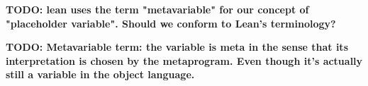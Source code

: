 \documentclass[table,dvipsnames,acmsmall]{acmart}
\theoremstyle{definition}
\begin{document}
\newcommand{\examp}[1]{{\nopad \footnotesize 
\[
\begin{array}[t]{@{}l}
#1
\end{array}
\]
}}


\newcommand{\cb}[1]{
$
\begin{array}[t]{@{}l}#1\end{array}
$
}




\newcommand{\ms}[1]{{\footnotesize $(#1)$}}

\newcommand{\code}[1]{\ms{\J{#1}}}


\newcommand{\R}[1]{\color{teal}\ \ [\emph{#1}]}
 
\newcommand{\subtypes}{<:}
\newcommand{\supertypes}{:>}
\newcommand{\I}{\hspace{4mm}}
\newcommand{\Z}{.\hspace{4mm}}
\newcommand{\Alpha}{\mathrm{A}}
\newcommand{\Tau}{\mathrm{T}}
\newcommand{\B}[1]{\textbf{#1}}
\newcommand{\F}[1]{\text{#1}}
\newcommand{\bigand}{\bigwedge\nolimits}
\newcommand{\bigor}{\bigvee\nolimits}
\newcommand{\C}[1]{\color{teal} \rhd\ \emph{#1}}
\newcommand{\com}[1]{\I \emph{#1}}
\newcommand{\D}[1]{\small \textsc{#1}}
\newcommand{\FIG}[1]{Fig. {\color{red} \ref{#1}}}
\newcommand{\TODO}[1]{\noindent \B{\color{red} TODO: #1}}

\newcommand{\is}{\ ::=\ }
\newcommand{\sep}{\ \ |\ \ }
\newcommand{\nonterm}[1]{#1\ }
\newcommand{\contin}{|\ \ \ \ \ \ \ }
\newcommand{\wrt}{\B{wrt }}



\newcommand{\pc}{\hfill \break \noindent \ $\diamond$ \ }


\newcommand{\N}{\ $\cdot$\ \ }

\newcommand{\pitem}{\item[$\diamond$]}

\newcommand{\tl}{\textasciitilde{}}
\newcommand{\typdiff}{\J{\textbackslash}}

\maketitle

\TODO{lean uses the term "metavariable" for our concept of "placeholder variable". Should we conform to Lean's terminology?}

\TODO{Metavariable term: the variable is meta in the sense that its interpretation is chosen by the metaprogram.
Even though it's actually still a variable in the object language.}
\end{document}
